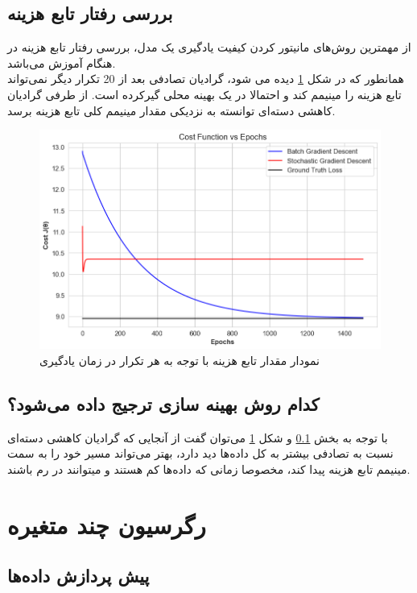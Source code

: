 \documentclass{article}
\begin{document}
	\subsection{بررسی رفتار تابع هزینه}\label{resuling}
	از مهمترین روش‌های مانیتور کردن کیفیت یادگیری یک مدل، بررسی رفتار تابع هزینه در هنگام آموزش می‌باشد.\\
	همانطور که در شکل
	\ref{fig: cost one var}
	دیده می شود، گرادیان تصادفی بعد از 20 تکرار دیگر نمی‌تواند تابع هزینه را مینیمم کند و احتمالا در یک بهینه محلی گیرکرده است. از طرفی گرادیان کاهشی دسته‌ای توانسته به نزدیکی مقدار مینیمم کلی تابع هزینه برسد.
	\begin{figure}[H]
		\centering
		\includegraphics[scale=0.5]{figs/costvsepoch_one_var}
		\caption{نمودار مقدار تابع هزینه با توجه به هر تکرار در زمان یادگیری}
		\label{fig: cost one var}
	\end{figure}
	\subsection{کدام روش بهینه سازی ترجیج داده می‌شود؟}
	با توجه به بخش
	\ref{resuling}	
	و شکل 
	\ref{fig: cost one var}
	می‌توان گفت از آنجایی که گرادیان کاهشی دسته‌ای نسبت به تصادفی بیشتر به کل داده‌ها دید دارد، بهتر می‌تواند مسیر خود را به سمت مینیمم تابع هزینه پیدا کند، مخصوصا زمانی که داده‌ها کم هستند و میتوانند در رم باشند.
	
	\section{رگرسیون چند متغیره}
	\subsection{پیش پردازش‌ داده‌ها}
\end{document}
